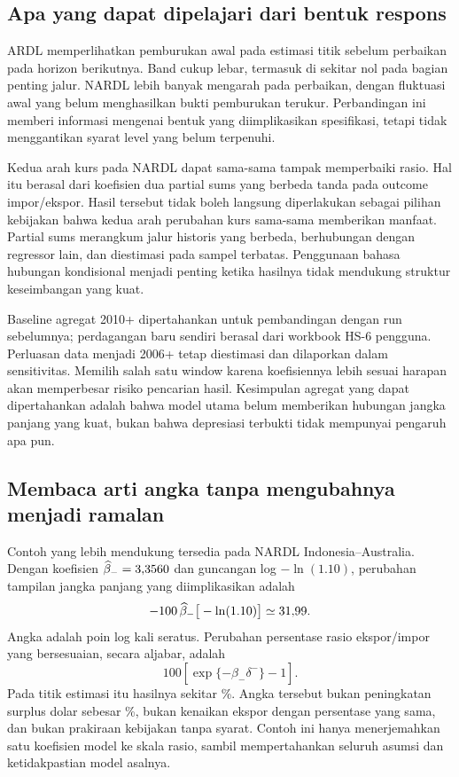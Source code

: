 \subsection{Apa yang dapat dipelajari dari bentuk respons}
ARDL memperlihatkan pemburukan awal pada estimasi titik sebelum perbaikan pada horizon berikutnya. Band cukup lebar, termasuk di sekitar nol pada bagian penting jalur. NARDL lebih banyak mengarah pada perbaikan, dengan fluktuasi awal yang belum menghasilkan bukti pemburukan terukur. Perbandingan ini memberi informasi mengenai bentuk yang diimplikasikan spesifikasi, tetapi tidak menggantikan syarat level yang belum terpenuhi.

Kedua arah kurs pada NARDL dapat sama-sama tampak memperbaiki rasio. Hal itu berasal dari koefisien dua partial sums yang berbeda tanda pada outcome impor/ekspor. Hasil tersebut tidak boleh langsung diperlakukan sebagai pilihan kebijakan bahwa kedua arah perubahan kurs sama-sama memberikan manfaat. Partial sums merangkum jalur historis yang berbeda, berhubungan dengan regressor lain, dan diestimasi pada sampel terbatas. Penggunaan bahasa hubungan kondisional menjadi penting ketika hasilnya tidak mendukung struktur keseimbangan yang kuat.

Baseline agregat 2010+ dipertahankan untuk pembandingan dengan run sebelumnya; perdagangan baru sendiri berasal dari workbook HS-6 pengguna. Perluasan data menjadi 2006+ tetap diestimasi dan dilaporkan dalam sensitivitas. Memilih salah satu window karena koefisiennya lebih sesuai harapan akan memperbesar risiko pencarian hasil. Kesimpulan agregat yang dapat dipertahankan adalah bahwa model utama belum memberikan hubungan jangka panjang yang kuat, bukan bahwa depresiasi terbukti tidak mempunyai pengaruh apa pun.

\subsection{Membaca arti angka tanpa mengubahnya menjadi ramalan}
Contoh yang lebih mendukung tersedia pada NARDL Indonesia--Australia. Dengan koefisien $\widehat{\beta}_-=3{,}3560$ dan guncangan log $-\ln(1.10)$, perubahan tampilan jangka panjang yang diimplikasikan adalah
\begin{equation}
 -100\,\widehat{\beta}_-\big[-\ln(1.10)\big]
 \simeq 31{,}99.
\end{equation}
Angka \AusResponse{} adalah poin log kali seratus. Perubahan persentase rasio ekspor/impor yang bersesuaian, secara aljabar, adalah
\begin{equation}
 100\left[\exp\{-\widehat{\beta}_-\delta^-\}-1\right].
\end{equation}
Pada titik estimasi itu hasilnya sekitar \AusRatioPct\%. Angka tersebut bukan peningkatan surplus dolar sebesar \AusRatioPct\%, bukan kenaikan ekspor dengan persentase yang sama, dan bukan prakiraan kebijakan tanpa syarat. Contoh ini hanya menerjemahkan satu koefisien model ke skala rasio, sambil mempertahankan seluruh asumsi dan ketidakpastian model asalnya.

